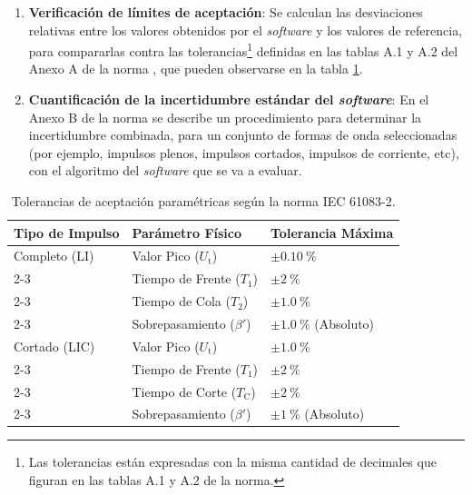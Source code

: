 \begin{enumerate}
    \item \textbf{Verificación de límites de aceptación}: Se calculan las desviaciones relativas entre los valores obtenidos por el \emph{software} y los valores de referencia, para compararlas contra las tolerancias\footnote{Las tolerancias están expresadas con la misma cantidad de decimales que figuran en las tablas A.1 y A.2 de la norma.} definidas en las tablas A.1 y A.2 del Anexo A de la norma \cite{iec61083_2}, que pueden observarse en la tabla \ref{tab:tolerancias_iec61083}.
    \item \textbf{Cuantificación de la incertidumbre estándar del \emph{software}}: En el Anexo B de la norma \cite{iec61083_2} se describe un procedimiento para determinar la incertidumbre combinada, para un conjunto de formas de onda seleccionadas (por ejemplo, impulsos plenos, impulsos cortados, impulsos de corriente, etc), con el algoritmo del \emph{software} que se va a evaluar.
\end{enumerate}

\vspace{3\baselineskip}
\begin{table}[H]
    \centering
    \caption{Tolerancias de aceptación paramétricas según la norma IEC 61083-2.}
    \label{tab:tolerancias_iec61083}
    \begin{tabular}{@{}lll@{}}
        \toprule
        \textbf{Tipo de Impulso} & \textbf{Parámetro Físico}      & \textbf{Tolerancia Máxima}          \\ \midrule
        Completo (LI)            & Valor Pico ($U_\text{t}$)      & $\pm\qty{0,10}{\percent}$           \\ \cmidrule(l){2-3}
                                 & Tiempo de Frente ($T_1$)       & $\pm\qty{2}{\percent}$              \\ \cmidrule(l){2-3}
                                 & Tiempo de Cola ($T_2$)         & $\pm\qty{1,0}{\percent}$            \\ \cmidrule(l){2-3}
                                 & Sobrepasamiento ($\beta'$)     & $\pm\qty{1,0}{\percent}$ (Absoluto) \\ \midrule
        Cortado (LIC)            & Valor Pico ($U_\text{t}$)      & $\pm\qty{1,0}{\percent}$            \\ \cmidrule(l){2-3}
                                 & Tiempo de Frente ($T_1$)       & $\pm\qty{2}{\percent}$              \\ \cmidrule(l){2-3}
                                 & Tiempo de Corte ($T_\text{C}$) & $\pm\qty{2}{\percent}$            \\ \cmidrule(l){2-3}
                                 & Sobrepasamiento ($\beta'$)     & $\pm\qty{1}{\percent}$ (Absoluto) \\ \bottomrule
    \end{tabular}
\end{table}
\vspace{3\baselineskip}

